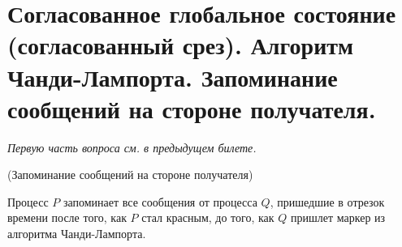 \section{Согласованное глобальное состояние (согласованный срез).
Алгоритм Чанди-Лампорта. Запоминание сообщений на стороне получателя.}

\textit{Первую часть вопроса см. в предыдущем билете.}

\begin{algorithm}(Запоминание сообщений на стороне получателя)

    Процесс $P$ запоминает все сообщения от процесса $Q$,
    пришедшие в отрезок времени после того, как $P$ стал красным, 
    до того, как $Q$ пришлет маркер из алгоритма Чанди-Лампорта.
\end{algorithm}
